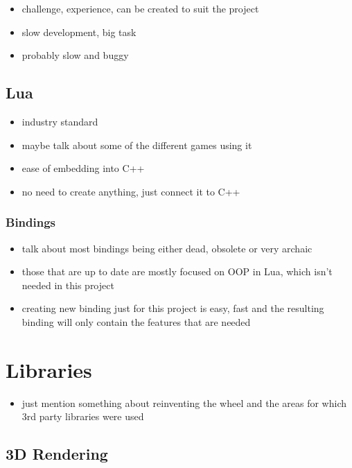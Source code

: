 \begin{itemize}
    \item challenge, experience, can be created to suit the project
    \item slow development, big task
    \item probably slow and buggy
\end{itemize}

\subsection{Lua}

\begin{itemize}
    \item industry standard
    \item maybe talk about some of the different games using it
    \item ease of embedding into C++
    \item no need to create anything, just connect it to C++
\end{itemize}

\subsubsection{Bindings}

\begin{itemize}
    \item talk about most bindings being either dead, obsolete or very
        archaic
    \item those that are up to date are mostly focused on OOP in Lua,
        which isn't needed in this project
    \item creating new binding just for this project is easy, fast and
        the resulting binding will only contain the features that are needed
\end{itemize}

\section{Libraries}

\begin{itemize}
    \item just mention something about reinventing the wheel and
        the areas for which 3rd party libraries were used
\end{itemize}

\subsection{3D Rendering}

